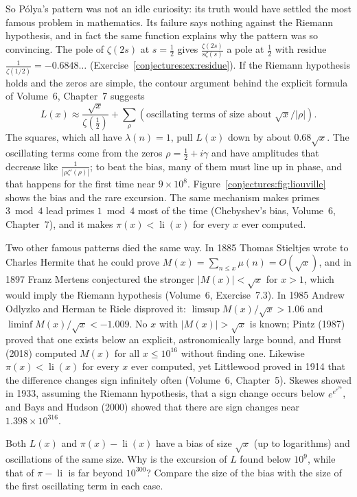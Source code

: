 So P\'olya's pattern was not an idle curiosity: its truth would have settled the most famous problem in mathematics. Its failure says nothing against the
Riemann hypothesis, and in fact the same function explains why the pattern was so convincing. The pole of $\zeta(2s)$ at $s=\frac12$ gives $\frac{\zeta(2s)}{s\zeta(s)}$ a pole at $\frac12$ with
residue $\frac1{\zeta(1/2)}=-0.6848\ldots$ (Exercise~\ref{conjectures:ex:residue}). If the Riemann hypothesis holds and the zeros are simple, the contour argument behind the
explicit formula of Volume~6, Chapter~7 suggests
\[
L(x)\approx\frac{\sqrt x}{\zeta(\frac12)}+\sum_\rho(\text{oscillating terms of size about }\sqrt x/|\rho|).
\]
The squares, which all have $\lambda(n)=1$, pull $L(x)$ down by about $0.68\sqrt x$. The oscillating terms come from the zeros $\rho=\frac12+i\gamma$ and have
amplitudes that decrease like $\frac1{|\rho\zeta'(\rho)|}$; to beat the bias, many of them must line up in phase, and that happens for the first time near
$9\times10^8$. Figure~\ref{conjectures:fig:liouville} shows the bias and the rare excursion. The same mechanism makes primes $3\bmod4$ lead primes $1\bmod4$ most of the time
(Chebyshev's bias, Volume~6, Chapter~7), and it makes $\pi(x)<\operatorname{li}(x)$ for every $x$ ever computed.

\begin{remark}
Two other famous patterns died the same way. In 1885 Thomas Stieltjes wrote to Charles Hermite that he could prove $M(x)=\sum_{n\le x}\mu(n)=O(\sqrt x)$, and
in 1897 Franz Mertens conjectured the stronger $|M(x)|<\sqrt x$ for $x>1$, which would imply the Riemann hypothesis (Volume~6, Exercise~7.3). In 1985 Andrew
Odlyzko and Herman te Riele disproved it: $\limsup M(x)/\sqrt x>1.06$ and $\liminf M(x)/\sqrt x<-1.009$. No $x$ with $|M(x)|>\sqrt x$ is known; Pintz (1987) proved
that one exists below an explicit, astronomically large bound, and Hurst (2018) computed $M(x)$ for all $x\le10^{16}$ without finding one. Likewise
$\pi(x)<\operatorname{li}(x)$ for every $x$ ever computed, yet Littlewood proved in 1914 that the difference changes sign infinitely often (Volume~6, Chapter~5).
Skewes showed in 1933, assuming the Riemann hypothesis, that a sign change occurs below $e^{e^{e^{79}}}$, and Bays and Hudson (2000) showed that there are sign
changes near $1.398\times10^{316}$.
\end{remark}

\begin{think}
Both $L(x)$ and $\pi(x)-\operatorname{li}(x)$ have a bias of size $\sqrt x$ (up to logarithms) and oscillations of the same size. Why is the excursion of $L$
found below $10^9$, while that of $\pi-\operatorname{li}$ is far beyond $10^{300}$? Compare the size of the bias with the size of the first oscillating term in each
case.
\end{think}

